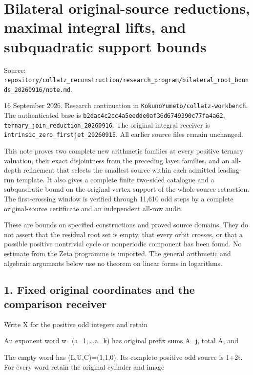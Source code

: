 \chapter{Bilateral original-source reductions, maximal integral lifts,
and subquadratic support bounds}
{\small\sffamily Source: \nolinkurl{repository/collatz_reconstruction/research_program/bilateral_root_bounds_20260916/note.md}.\par}


16 September 2026. Research continuation in
\nolinkurl{KokunoYumeto/collatz-workbench}. The authenticated base is
\nolinkurl{b2dac4c2cc4a5eedde0af36d6749390c77fa4a62},
\nolinkurl{ternary_join_reduction_20260916}. The original integral
receiver is \nolinkurl{intrinsic_zero_firstjet_20260915}. All earlier
source files remain unchanged.

This note proves two complete new arithmetic families at every positive
ternary valuation, their exact disjointness from the preceding layer
families, and an all-depth refinement that selects the smallest source
within each admitted leading-run template. It also gives a complete
finite two-sided catalogue and a subquadratic bound on the original
vertex support of the whole-source retraction. The first-crossing window
is verified through 11,610 odd steps by a complete original-source
certificate and an independent all-row audit.

These are bounds on specified constructions and proved source domains.
They do not assert that the residual root set is empty, that every orbit
crosses, or that a possible positive nontrivial cycle or nonperiodic
component has been found. No estimate from the Zeta programme is
imported. The general arithmetic and algebraic arguments below use no
theorem on linear forms in logarithms.

\section{1. Fixed original coordinates and the comparison receiver}

Write X for the positive odd integers and retain


An exponent word w=(a\_1,\ldots,a\_k) has original prefix sums A\_j,
total A, and


The empty word has (L,U,C)=(1,1,0). Its complete positive odd source is
1+2t. For every word retain the original cylinder and image

